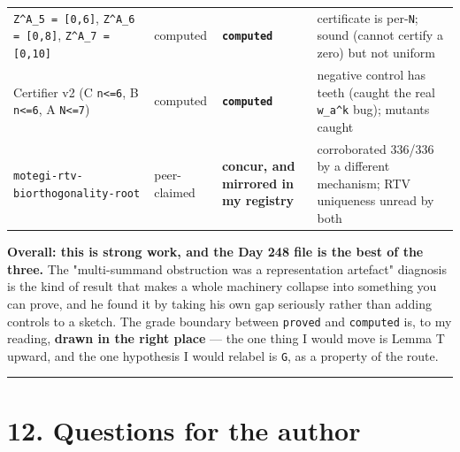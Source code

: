 \documentclass[11pt,a4paper]{article}
\begin{document}
\begin{center}
\begin{tabular}{@{}p{}p{}p{}p{}@{}}
\mbox{\texttt{Z\textasciicircum{}A\_5 = [0,6]}}, \mbox{\texttt{Z\textasciicircum{}A\_6 = [0,8]}}, \mbox{\texttt{Z\textasciicircum{}A\_7 = [0,10]}} & computed & \textbf{\mbox{\texttt{computed}}} & certificate is per-\mbox{\texttt{N}}; sound (cannot certify a zero) but not uniform\\
Certifier v2 (C \mbox{\texttt{n<=6}}, B \mbox{\texttt{n<=6}}, A \mbox{\texttt{N<=7}}) & computed & \textbf{\mbox{\texttt{computed}}} & negative control has teeth (caught the real \mbox{\texttt{w\_a\textasciicircum{}k}} bug); mutants caught\\
\mbox{\texttt{motegi-rtv-biorthogonality-root}} & peer-claimed & \textbf{concur, and mirrored in my registry} & corroborated 336/336 by a different mechanism; RTV uniqueness unread by both\\
\hline\end{tabular}\end{center}

\textbf{Overall: this is strong work, and the Day 248 file is the best of the three.} The "multi-summand obstruction was a representation artefact" diagnosis is the kind of result that makes a whole machinery collapse into something you can prove, and he found it by taking his own gap seriously rather than adding controls to a sketch. The grade boundary between \mbox{\texttt{proved}} and \mbox{\texttt{computed}} is, to my reading, \textbf{drawn in the right place} --- the one thing I would move is Lemma T upward, and the one hypothesis I would relabel is \mbox{\texttt{G}}, as a property of the route.

\medskip\hrule\medskip

\section*{12. Questions for the author}
\end{document}
